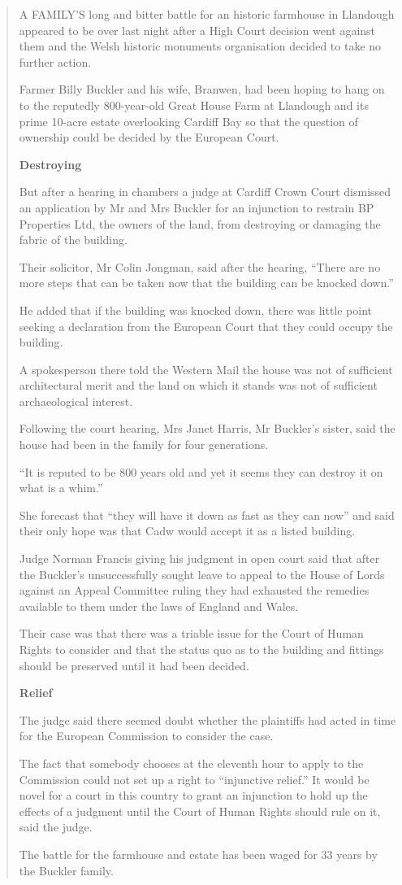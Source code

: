\documentclass[11pt,a4paper]{article}
\begin{document}
\begin{quote}
A FAMILY'S long and bitter battle for an historic farmhouse in Llandough appeared to be over last night after a High Court decision went against them and the Welsh historic monuments organisation decided to take no further action.

Farmer Billy Buckler and his wife, Branwen, had been hoping to hang on to the reputedly 800-year-old Great House Farm at Llandough and its prime 10-acre estate overlooking Cardiff Bay so that the question of ownership could be decided by the European Court.

\textbf{Destroying}

But after a hearing in chambers a judge at Cardiff Crown Court dismissed an application by Mr and Mrs Buckler for an injunction to restrain BP Properties Ltd, the owners of the land, from destroying or damaging the fabric of the building.

Their solicitor, Mr Colin Jongman, said after the hearing, ``There are no more steps that can be taken now that the building can be knocked down.''

He added that if the building was knocked down, there was little point seeking a declaration from the European Court that they could occupy the building.

A spokesperson there told the Western Mail the house was not of sufficient architectural merit and the land on which it stands was not of sufficient archaeological interest.

Following the court hearing, Mrs Janet Harris, Mr Buckler's sister, said the house had been in the family for four generations.

``It is reputed to be 800 years old and yet it seems they can destroy it on what is a whim.''

She forecast that ``they will have it down as fast as they can now'' and said their only hope was that Cadw would accept it as a listed building.

Judge Norman Francis giving his judgment in open court said that after the Buckler's unsuccessfully sought leave to appeal to the House of Lords against an Appeal Committee ruling they had exhausted the remedies available to them under the laws of England and Wales.

Their case was that there was a triable issue for the Court of Human Rights to consider and that the status quo as to the building and fittings should be preserved until it had been decided.

\textbf{Relief}

The judge said there seemed doubt whether the plaintiffs had acted in time for the European Commission to consider the case.

The fact that somebody chooses at the eleventh hour to apply to the Commission could not set up a right to ``injunctive relief.'' It would be novel for a court in this country to grant an injunction to hold up the effects of a judgment until the Court of Human Rights should rule on it, said the judge.

The battle for the farmhouse and estate has been waged for 33 years by the Buckler family.
\end{quote}
\end{document}
